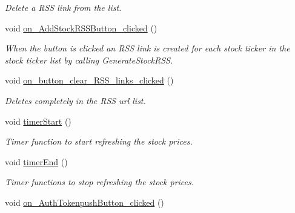 \begin{DoxyCompactItemize}
\begin{DoxyCompactList}\small\item\em Delete a R\+S\+S link from the list. \end{DoxyCompactList}\item 
\hypertarget{class_t_k_r_t_a_p_ad764cc0d854eb1cf61ad741de1b78368}{void \hyperlink{class_t_k_r_t_a_p_ad764cc0d854eb1cf61ad741de1b78368}{on\+\_\+\+Add\+Stock\+R\+S\+S\+Button\+\_\+clicked} ()}\label{class_t_k_r_t_a_p_ad764cc0d854eb1cf61ad741de1b78368}

\begin{DoxyCompactList}\small\item\em When the button is clicked an R\+S\+S link is created for each stock ticker in the stock ticker list by calling Generate\+Stock\+R\+S\+S. \end{DoxyCompactList}\item 
\hypertarget{class_t_k_r_t_a_p_a67ebb1c57c2e2a05a7750e0e42d1b500}{void \hyperlink{class_t_k_r_t_a_p_a67ebb1c57c2e2a05a7750e0e42d1b500}{on\+\_\+button\+\_\+clear\+\_\+\+R\+S\+S\+\_\+links\+\_\+clicked} ()}\label{class_t_k_r_t_a_p_a67ebb1c57c2e2a05a7750e0e42d1b500}

\begin{DoxyCompactList}\small\item\em Deletes completely in the R\+S\+S url list. \end{DoxyCompactList}\item 
\hypertarget{class_t_k_r_t_a_p_adb0ea6e18fbf661f2bf52655f552b907}{void \hyperlink{class_t_k_r_t_a_p_adb0ea6e18fbf661f2bf52655f552b907}{timer\+Start} ()}\label{class_t_k_r_t_a_p_adb0ea6e18fbf661f2bf52655f552b907}

\begin{DoxyCompactList}\small\item\em Timer function to start refreshing the stock prices. \end{DoxyCompactList}\item 
\hypertarget{class_t_k_r_t_a_p_a6bdc036a4c99e281cc12fb7ab81e8922}{void \hyperlink{class_t_k_r_t_a_p_a6bdc036a4c99e281cc12fb7ab81e8922}{timer\+End} ()}\label{class_t_k_r_t_a_p_a6bdc036a4c99e281cc12fb7ab81e8922}

\begin{DoxyCompactList}\small\item\em Timer functions to stop refreshing the stock prices. \end{DoxyCompactList}\item 
\hypertarget{class_t_k_r_t_a_p_a9742278d8b60423159e21585bbe1c68b}{void \hyperlink{class_t_k_r_t_a_p_a9742278d8b60423159e21585bbe1c68b}{on\+\_\+\+Auth\+Tokenpush\+Button\+\_\+clicked} ()}\label{class_t_k_r_t_a_p_a9742278d8b60423159e21585bbe1c68b}


\end{DoxyCompactItemize}
